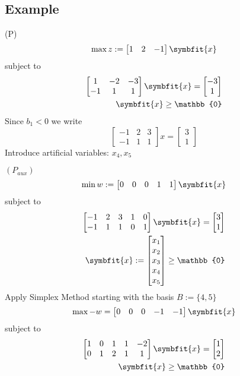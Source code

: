 \subsection{Example}
(P)
\[ \max z:= \begin{bmatrix} 1 & 2 & -1 \end{bmatrix} \symbfit{x} \]
subject to
\begin{align}
    \begin{bmatrix}
        1 & -2 & -3\\
        -1 & 1 & 1
    \end{bmatrix}
    \symbfit{x} =
    \begin{bmatrix}
        -3\\
        1
    \end{bmatrix}\\
    \symbfit{x}\ge \mathbb{0}
\end{align}
Since $ b_1<0 $
we write
\[ \begin{bmatrix}
    -1 & 2 & 3\\
    -1 & 1 & 1
\end{bmatrix}
x=
\begin{bmatrix}
    3\\
    1
\end{bmatrix}
\]
Introduce artificial variables: $ x_4, x_5 $

$ (P_{aux}) $ 
\[\min w:=\begin{bmatrix} 0 & 0 & 0 & 1 & 1 \end{bmatrix} \symbfit{x} \]
subject to
\begin{align}
    \begin{bmatrix}
        -1 & 2 & 3 & 1 & 0\\
        -1 & 1 & 1 & 0 & 1
    \end{bmatrix}
    \symbfit{x}=
    \begin{bmatrix}
        3\\
        1
    \end{bmatrix}\\
    \symbfit{x}:=
    \begin{bmatrix}
        x_1\\
        x_2\\
        x_3\\
        x_4\\
        x_5\\
    \end{bmatrix} \ge \mathbb{0}
\end{align}
Apply Simplex Method starting with the basis $ B:=\{4,5\} $
\[\max -w=\begin{bmatrix} 0 & 0 & 0 & -1 & -1 \end{bmatrix} \symbfit{x} \]
subject to
\begin{align}
    \begin{bmatrix}
        1 & 0 & 1 & 1 & -2\\
        0 & 1 & 2 & 1 & 1
    \end{bmatrix}
    \symbfit{x}=
    \begin{bmatrix}
        1\\
        2
    \end{bmatrix}\\
    \symbfit{x}\ge \mathbb{0}
\end{align}

